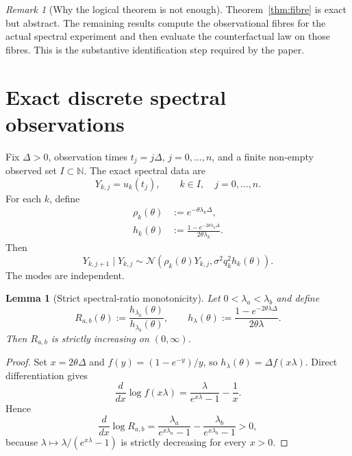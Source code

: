 \documentclass[11pt]{article}
\newtheorem{lemma}[assumption]{Lemma}
\theoremstyle{remark}
\newtheorem{remark}[assumption]{Remark}
\newcommand{\N}{\mathbb N}
\newcommand{\1}{\mathbf 1}
\begin{document}
\begin{remark}[Why the logical theorem is not enough]
Theorem~\ref{thm:fibre} is exact but abstract.  The remaining results compute the observational fibres for the actual spectral experiment and then evaluate the counterfactual law on those fibres.  This is the substantive identification step required by the paper.
\end{remark}

\section{Exact discrete spectral observations}

Fix $\Delta>0$, observation times $t_j=j\Delta$, $j=0,\ldots,n$, and a finite non-empty observed set $I\subset\N$.  The exact spectral data are
\[
 Y_{k,j}=u_k(t_j),
 \qquad k\in I,
 \quad j=0,\ldots,n.
\]
For each $k$, define
\begin{align}
 \rho_k(\theta)&:=e^{-\theta\lambda_k\Delta},\label{eq:rho}\\
 h_k(\theta)&:=\frac{1-e^{-2\theta\lambda_k\Delta}}
 {2\theta\lambda_k}.\label{eq:hk}
\end{align}
Then
\begin{equation}\label{eq:transition}
 Y_{k,j+1}\mid Y_{k,j}
 \sim\mathcal N\left(
 \rho_k(\theta)Y_{k,j},
 \sigma^2q_k^2h_k(\theta)
 \right).
\end{equation}
The modes are independent.

\begin{lemma}[Strict spectral-ratio monotonicity]\label{lem:ratio}
Let $0<\lambda_a<\lambda_b$ and define
\[
 R_{a,b}(\theta)
 :=\frac{h_{\lambda_a}(\theta)}{h_{\lambda_b}(\theta)},
 \qquad
 h_\lambda(\theta)
 :=\frac{1-e^{-2\theta\lambda\Delta}}
 {2\theta\lambda}.
\]
Then $R_{a,b}$ is strictly increasing on $(0,\infty)$.
\end{lemma}

\begin{proof}
Set $x=2\theta\Delta$ and $f(y)=(1-e^{-y})/y$, so $h_\lambda(\theta)=\Delta f(x\lambda)$.  Direct differentiation gives
\[
 \frac{d}{dx}\log f(x\lambda)
 =\frac{\lambda}{e^{x\lambda}-1}-\frac1x.
\]
Hence
\[
 \frac{d}{dx}\log R_{a,b}
 =\frac{\lambda_a}{e^{x\lambda_a}-1}
 -\frac{\lambda_b}{e^{x\lambda_b}-1}>0,
\]
because $\lambda\mapsto\lambda/(e^{x\lambda}-1)$ is strictly decreasing for every $x>0$.
\end{proof}
\end{document}
